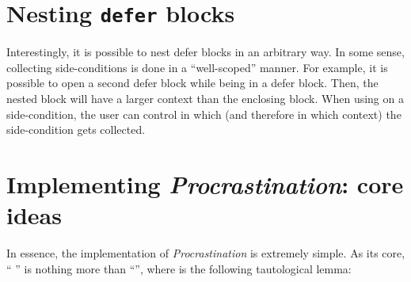 \documentclass[xetex,format=acmlarge,screen=true,authorversion=true]{acmart-modified}
\begin{document}
\section{Nesting \texttt{defer} blocks}

Interestingly, it is possible to nest defer blocks in an arbitrary way.
In some sense, collecting side-conditions is done in a ``well-scoped'' manner.
For example, it is possible to open a second defer block while being in
a defer block. Then, the nested block will have a larger context than
the enclosing block. When using  on a side-condition, the user
can control in which  (and therefore in which context) the
side-condition gets collected.




\section{Implementing \emph{Procrastination}: core ideas}

In essence, the implementation of \emph{Procrastination} is extremely simple. As
its core, `` '' is nothing more than
``'', where  is the following
tautological lemma:
\end{document}
